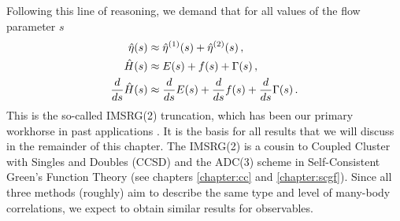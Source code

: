 Following this line of reasoning,  we demand that for all values of the
flow parameter $s$
\begin{align} 
  \etaO(s) &\approx\etaO^{(1)}(s)+\etaO^{(2)}(s)\,,\label{eq:imsrg2_eta}\\
  \HO(s) &\approx E(s) + f(s) + \Gamma(s)\,,\label{eq:imsrg2_H}\\
  \totd{}{s}\HO(s) &\approx \totd{}{s}E(s) + \totd{}{s}f(s) + \totd{}{s}\Gamma(s)\label{eq:imsrg2_dH}\,.
\end{align}
This is the so-called IMSRG(2) truncation, which has been our primary
workhorse in past applications 
\cite{Tsukiyama:2011uq,Tsukiyama:2012fk,Hergert:2013mi,Hergert:2013ij,Hergert:2014vn,Morris:2015ve,Hergert:2016jk}. It is the basis for all results that we will discuss in the remainder of this chapter. 
The IMSRG(2) is a cousin to Coupled Cluster with Singles and Doubles
(CCSD) and the ADC(3) scheme in Self-Consistent Green's Function Theory 
(see chapters \ref{chapter:cc} and \ref{chapter:scgf}). Since all three
methods (roughly) aim to describe the same type and level of many-body 
correlations, we expect to obtain similar results for observables.


